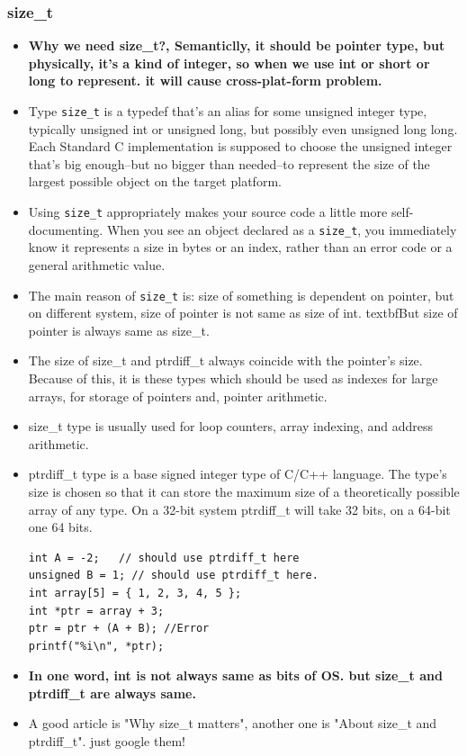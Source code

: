 \documentclass[a4paper,11pt,twoside]{book}
\begin{document}
\subsubsection{size\_t}
\begin{itemize}
	\item \textbf{Why we need size\_t?, Semanticlly, it should be pointer type, but physically, it's a kind of integer, so when we use int or short or long to represent. it will cause cross-plat-form problem.}
	
	\item Type \texttt{size\_t} is a typedef that's an alias for some unsigned integer type, typically unsigned int or unsigned long, but possibly even unsigned long long. Each Standard C implementation is supposed to choose the unsigned integer that's big enough--but no bigger than needed--to represent the size of the largest possible object on the target platform.
	
	\item Using \texttt{size\_t} appropriately makes your source code a little more self-documenting. When you see an object declared as a \texttt{size\_t}, you immediately know it represents a size in bytes or an index, rather than an error code or a general arithmetic value.
	
	\item The main reason of \texttt{size\_t} is: size of something is dependent on pointer, but on different system, size of pointer is not same as size of int.  textbf{But size of pointer is always same as size\_t}.
	
	\item The size of size\_t and ptrdiff\_t always coincide with the pointer's size. Because of this, it is these types which should be used as indexes for large arrays, for storage of pointers and, pointer arithmetic.
	
	\item size\_t type is usually used for loop counters, array indexing, and address arithmetic.
	
	\item ptrdiff\_t type is a base signed integer type of C/C++ language. The type's size is chosen so that it can store the maximum size of a theoretically possible array of any type. On a 32-bit system ptrdiff\_t will take 32 bits, on a 64-bit one 64 bits.
\begin{lstlisting}[numbers=none]
int A = -2;   // should use ptrdiff_t here
unsigned B = 1; // should use ptrdiff_t here.
int array[5] = { 1, 2, 3, 4, 5 };
int *ptr = array + 3;
ptr = ptr + (A + B); //Error
printf("%i\n", *ptr);
\end{lstlisting}
	
	\item \textbf{In one word, int is not always same as bits of OS. but size\_t and ptrdiff\_t are always same.}
	
	\item A good article is "Why size\_t matters", another one is "About size\_t and ptrdiff\_t". just google them!   
\end{itemize}
\end{document}
